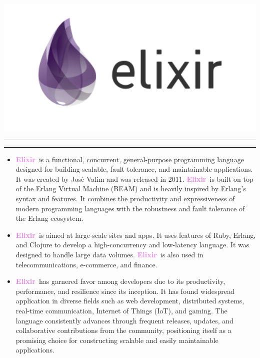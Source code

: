 \documentclass[12pt]{article}
\newcommand{\vio}[1]{\textbf{\textcolor{violet}{#1}}}
\newcommand{\elix}{\vio{Elixir}}
\begin{document}
\begin{center}
    \includegraphics[width=1\textwidth]{elixir.png}  
\end{center}
\vspace{2em}
\hrule\vspace{0.2em}\hrule
\vspace{2em}
{\large
\begin{itemize}
    \item \elix\ is a functional, concurrent, general-purpose programming language designed for building scalable, fault-tolerance, and maintainable applications. It was created by José Valim and was released in 2011. \elix\ is built on top of the Erlang Virtual Machine (BEAM) and is heavily inspired by Erlang's syntax and features. It combines the productivity and expressiveness of modern programming languages with the robustness and fault tolerance of the Erlang ecosystem. 

    \item \elix\ is aimed at large-scale sites and apps. It uses features of Ruby, Erlang, and Clojure to develop a high-concurrency and low-latency language. It was designed to handle large data volumes. \elix\ is also used in telecommunications, e-commerce, and finance. 

    \item \elix\ has garnered favor among developers due to its productivity, performance, and resilience since its inception. It has found widespread application in diverse fields such as web development, distributed systems, real-time communication, Internet of Things (IoT), and gaming. The language consistently advances through frequent releases, updates, and collaborative contributions from the community, positioning itself as a promising choice for constructing scalable and easily maintainable applications.

\end{itemize}
}
\end{document}
